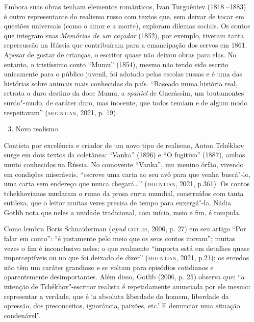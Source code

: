 \documentclass[11pt]{extarticle}
\begin{document}
Embora suas obras tenham elementos românticos, Ivan Turguêniev (1818
--1883) é outro representante do realismo russo com textos que, sem
deixar de tocar em questões universais (como o amor e a morte), exploram
dilemas sociais. Os contos que integram suas \emph{Memórias de um
caçador} (1852), por exemplo, tiveram tanta repercussão na Rússia que
contribuíram para a emancipação dos servos em 1861. Apesar de gostar de
crianças, o escritor quase não deixou obras para elas. No entanto, o
tristíssimo conto ``Mumu'' (1854), mesmo não tendo sido escrito
unicamente para o público juvenil, foi adotado pelas escolas russas e é
uma das histórias sobre animais mais conhecidas do país. ``Baseado numa
história real, retrata o duro destino da doce Mumu, a \emph{spaniel} de
Guerássim, um brutamontes surdo"-mudo, de caráter duro, mas inocente, que
todos temiam e de algum modo respeitavam'' (\textsc{mountian}, 2021, p. 19).


\begin{enumerate}
\setcounter{enumi}{2}
\item Novo realismo
\end{enumerate}

Contista por excelência e criador de um novo tipo de realismo, Anton
Tchékhov surge em dois textos da coletânea: ``Vanka'' (1896) e ``O
fugitivo'' (1887), ambos muito conhecidos na Rússia. No comovente
``Vanka''\emph{,} um menino órfão, vivendo em condições miseráveis,
``escreve uma carta ao seu avô para que venha buscá"-lo, uma carta sem
endereço que nunca chegará\ldots{}'' (\textsc{mountian}, 2021, p.361). Os contos
tchekhovianos mudaram o rumo da prosa curta mundial, construídos com
tanta sutileza, que o leitor muitas vezes precisa de tempo para
enxergá"-la. Nádia Gotlib nota que neles a unidade tradicional, com
início, meio e fim, é rompida.

Como lembra Boris Schnaiderman
(\emph{apud} \textsc{gotlib}, 2006, p. 27) em seu artigo ``Por falar em conto'':
``é justamente pelo meio que os seus contos inovam''; muitas vezes o fim
é inconclusivo neles; o que realmente ``importa está em detalhes quase
imperceptíveis ou no que foi deixado de dizer'' (\textsc{mountian}, 2021, p.21);
os enredos não têm um caráter grandioso e se voltam para episódios
cotidianos e aparentemente desimportantes. Além disso, Gotlib (2006, p.
25) observa que: ``a intenção de Tchékhov"-escritor realista é
repetidamente anunciada por ele mesmo: representar a verdade, que é `a
absoluta liberdade do homem, liberdade da opressão, dos preconceitos,
ignorância, paixões, etc.' E denunciar uma situação condenável''.
\end{document}
